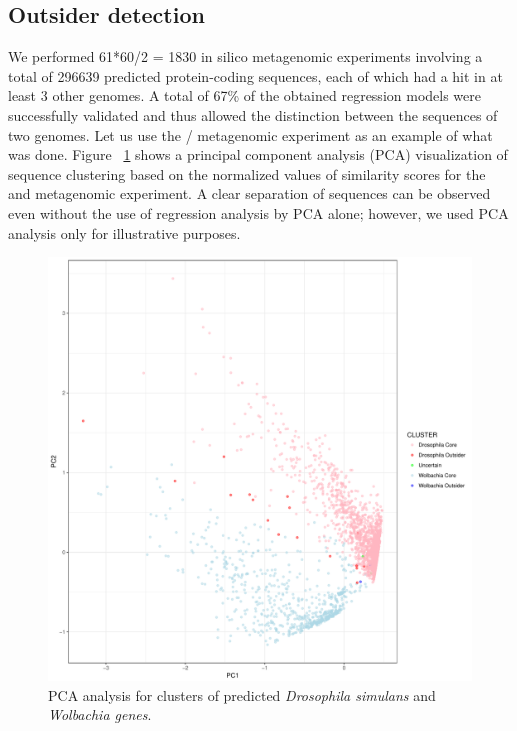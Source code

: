 \subsection{Outsider detection}
\label{outsider_detection}
We performed 61*60/2 = 1830 in silico metagenomic experiments involving a total
of 296639 predicted protein-coding sequences, each of which had a hit in at
least 3 other genomes. A total of 67\% of the obtained regression models were
successfully validated and thus allowed the distinction between the sequences
of two genomes. Let us use the /
 metagenomic experiment as an example of what was done. Figure
~\ref{fig:pca_analysis} shows a principal component analysis (PCA)
visualization of sequence clustering based on the normalized values of
similarity scores for the  and 
metagenomic experiment. A clear separation of sequences can be observed even
without the use of regression analysis by PCA alone; however, we used PCA
analysis only for illustrative purposes.
\begin{center}
\begin{figure}
\includegraphics[width=12cm]{figures/w_eds_vs_ds_bootstrapped_pc1_pc2.pdf}
\caption{PCA analysis for clusters of predicted \textit{Drosophila simulans}
	and \textit{Wolbachia genes}.}
\label{fig:pca_analysis}
\end{figure}
\end{center}
